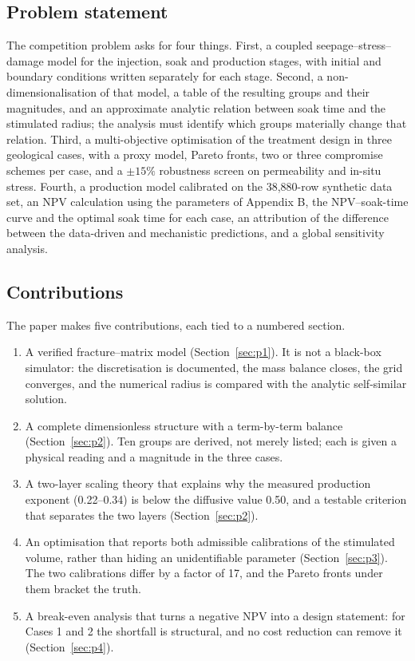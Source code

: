 \documentclass{swmcmthesis}
\begin{document}
\subsection{Problem statement}
The competition problem asks for four things. First, a coupled seepage--stress--damage model for the injection, soak and production stages, with initial and boundary conditions written separately for each stage. Second, a non-dimensionalisation of that model, a table of the resulting groups and their magnitudes, and an approximate analytic relation between soak time and the stimulated radius; the analysis must identify which groups materially change that relation. Third, a multi-objective optimisation of the treatment design in three geological cases, with a proxy model, Pareto fronts, two or three compromise schemes per case, and a $\pm15\%$ robustness screen on permeability and in-situ stress. Fourth, a production model calibrated on the 38,880-row synthetic data set, an NPV calculation using the parameters of Appendix B, the NPV--soak-time curve and the optimal soak time for each case, an attribution of the difference between the data-driven and mechanistic predictions, and a global sensitivity analysis.

\subsection{Contributions}
The paper makes five contributions, each tied to a numbered section.
\begin{enumerate}[leftmargin=2em,itemsep=2pt]
\item A verified fracture--matrix model (Section~\ref{sec:p1}). It is not a black-box simulator: the discretisation is documented, the mass balance closes, the grid converges, and the numerical radius is compared with the analytic self-similar solution.
\item A complete dimensionless structure with a term-by-term balance (Section~\ref{sec:p2}). Ten groups are derived, not merely listed; each is given a physical reading and a magnitude in the three cases.
\item A two-layer scaling theory that explains why the measured production exponent (0.22--0.34) is below the diffusive value 0.50, and a testable criterion that separates the two layers (Section~\ref{sec:p2}).
\item An optimisation that reports both admissible calibrations of the stimulated volume, rather than hiding an unidentifiable parameter (Section~\ref{sec:p3}). The two calibrations differ by a factor of 17, and the Pareto fronts under them bracket the truth.
\item A break-even analysis that turns a negative NPV into a design statement: for Cases 1 and 2 the shortfall is structural, and no cost reduction can remove it (Section~\ref{sec:p4}).
\end{enumerate}
\end{document}
